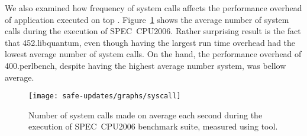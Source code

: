 We also examined how frequency of system calls affects the performance
overhead of application executed on top \mx. Figure~\ref{fig:syscall} shows
the average number of system calls during the execution of SPEC~CPU2006.
Rather surprising result is the fact that 452.libquantum, even though having
the largest run time overhead had the lowest average number of system calls.
On the hand, the performance overhead of 400.perlbench, despite having the
highest average number system, was bellow average.

\begin{figure}[ht]
\centering
\texttt{[image: safe-updates/graphs/syscall]}
\caption{Number of system calls made on average each second during the
execution of SPEC~CPU2006 benchmark suite, measured using 
tool.}
\label{fig:syscall}
\end{figure}


